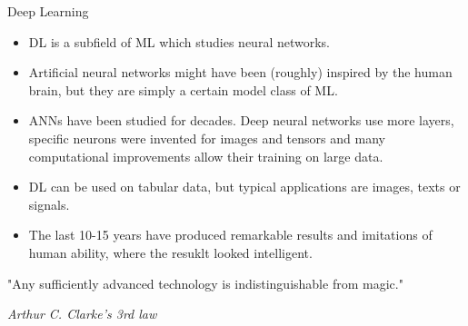 \documentclass[11pt,compress,t,notes=noshow, xcolor=table]{beamer}
\begin{document}

\begin{vbframe}{Deep Learning}

\begin{itemize}
\item DL is a subfield of ML which studies neural networks.
\item Artificial neural networks might have been (roughly) inspired by the human brain, but they are simply a certain model class of ML.
\item ANNs have been studied for decades. Deep neural networks use more layers, 
        specific neurons were invented for images and tensors and many computational 
        improvements allow their training on large data.
\item DL can be used on tabular data, but typical applications are images, texts or signals. 
\item The last 10-15 years have produced remarkable results and imitations of human ability, where the resuklt looked intelligent. 
\end{itemize}

\lz

"Any sufficiently advanced technology is indistinguishable from magic."
\begin{footnotesize}
\emph{Arthur C. Clarke's 3rd law}
\end{footnotesize}
 

\end{vbframe}

\end{document}
